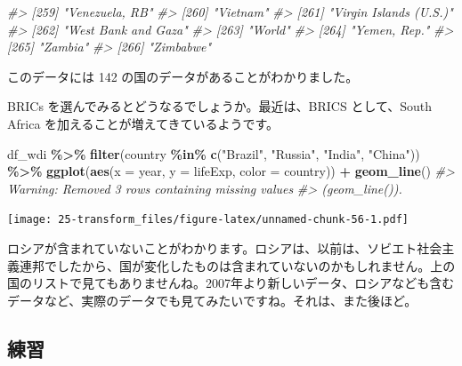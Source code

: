 \documentclass[
  xelatex, ja=standard]{bxjsbook}
\newenvironment{Shaded}{\begin{snugshade}}{\end{snugshade}}
\newcommand{\AttributeTok}[1]{\textcolor[rgb]{0.13,0.29,0.53}{#1}}
\newcommand{\CommentTok}[1]{\textcolor[rgb]{0.56,0.35,0.01}{\textit{#1}}}
\newcommand{\FunctionTok}[1]{\textcolor[rgb]{0.13,0.29,0.53}{\textbf{#1}}}
\newcommand{\NormalTok}[1]{#1}
\newcommand{\SpecialCharTok}[1]{\textcolor[rgb]{0.81,0.36,0.00}{\textbf{#1}}}
\newcommand{\StringTok}[1]{\textcolor[rgb]{0.31,0.60,0.02}{#1}}
\theoremstyle{definition}
\theoremstyle{definition}
\theoremstyle{definition}
\theoremstyle{definition}
\theoremstyle{remark}
\begin{document}
\begin{Shaded}
\begin{Highlighting}[]
\CommentTok{\#\textgreater{} [259] "Venezuela, RB"                                       }
\CommentTok{\#\textgreater{} [260] "Vietnam"                                             }
\CommentTok{\#\textgreater{} [261] "Virgin Islands (U.S.)"                               }
\CommentTok{\#\textgreater{} [262] "West Bank and Gaza"                                  }
\CommentTok{\#\textgreater{} [263] "World"                                               }
\CommentTok{\#\textgreater{} [264] "Yemen, Rep."                                         }
\CommentTok{\#\textgreater{} [265] "Zambia"                                              }
\CommentTok{\#\textgreater{} [266] "Zimbabwe"}
\end{Highlighting}
\end{Shaded}

このデータには 142 の国のデータがあることがわかりました。

BRICs を選んでみるとどうなるでしょうか。最近は、BRICS として、South Africa を加えることが増えてきているようです。

\begin{Shaded}
\begin{Highlighting}[]
\NormalTok{df\_wdi }\SpecialCharTok{\%\textgreater{}\%} \FunctionTok{filter}\NormalTok{(country }\SpecialCharTok{\%in\%} \FunctionTok{c}\NormalTok{(}\StringTok{"Brazil"}\NormalTok{, }\StringTok{"Russia"}\NormalTok{, }\StringTok{"India"}\NormalTok{, }\StringTok{"China"}\NormalTok{)) }\SpecialCharTok{\%\textgreater{}\%}
  \FunctionTok{ggplot}\NormalTok{(}\FunctionTok{aes}\NormalTok{(}\AttributeTok{x =}\NormalTok{ year, }\AttributeTok{y =}\NormalTok{ lifeExp, }\AttributeTok{color =}\NormalTok{ country)) }\SpecialCharTok{+} \FunctionTok{geom\_line}\NormalTok{()}
\CommentTok{\#\textgreater{} Warning: Removed 3 rows containing missing values}
\CommentTok{\#\textgreater{} (\textasciigrave{}geom\_line()\textasciigrave{}).}
\end{Highlighting}
\end{Shaded}

\texttt{[image: 25-transform\_files/figure-latex/unnamed-chunk-56-1.pdf]}

ロシアが含まれていないことがわかります。ロシアは、以前は、ソビエト社会主義連邦でしたから、国が変化したものは含まれていないのかもしれません。上の国のリストで見てもありませんね。2007年より新しいデータ、ロシアなども含むデータなど、実際のデータでも見てみたいですね。それは、また後ほど。

\hypertarget{ux7df4ux7fd2-3}{%
\subsection{練習}\label{ux7df4ux7fd2-3}}
\end{document}
